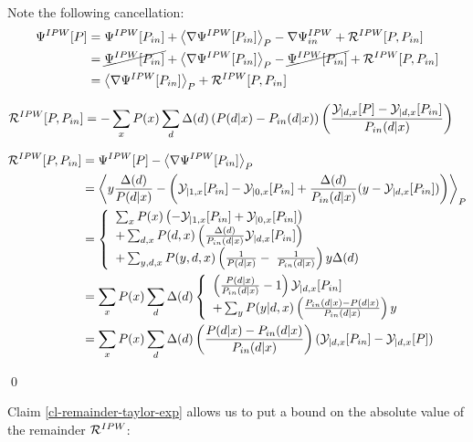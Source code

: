 Note the following cancellation:
\begin{align}
\Psi^{IPW}[P] &=
\Psi^{IPW}[P_{in}]
 + \left\langle\nabla\Psi^{IPW}[P_{in}]\right\rangle_P -\nabla\Psi^{IPW}_{in}
 + {\cal R}^{IPW}[P,P_{in}]
\\
&=
\cancel{\Psi^{IPW}[P_{in}] }
 + \left\langle\nabla\Psi^{IPW}[P_{in}]\right\rangle_P -\cancel{\Psi^{IPW}[P_{in}] }
 + {\cal R}^{IPW}[P,P_{in}]
 \\
&=
 \left\langle\nabla\Psi^{IPW}[P_{in}]\right\rangle_P
 + {\cal R}^{IPW}[P,P_{in}]
\end{align}

\begin{claim}
\label{cl-remainder-taylor-exp}
\begin{align}
{\cal R}^{IPW}[P,P_{in}]&=-
\sum_x P(x)\sum_d \Delta(d)
\left(
P(d|x)-P_{in}(d|x)
\right)
\left(
\frac{
{\cal Y}_{|d,x}[P]-{\cal Y}_{|d,x}[P_{in}]}
{P_{in}(d|x)}
\right)
\end{align}
\end{claim}
\proof

\begin{align}
{\cal R}^{IPW}[P,P_{in}]
&=
\Psi^{IPW}[P]
-\left\langle\nabla\Psi^{IPW}[P_{in}]\right\rangle_P
\\
&=
\left\langle
y \frac{\Delta(d)}{P(d|x)}
-
\left(
{\cal Y}_{|1,x}[P_{in}]
-
{\cal Y}_{|0,x}[P_{in}]
+
\frac{\Delta(d)}{P_{in}(d|x)}
(y-{\cal Y}_{|d,x}[P_{in}])
\right)
\right\rangle_{P}
\\
&=
\left\{
\begin{array}{l}
\sum_x P(x)\left(
-{\cal Y}_{|1,x}[P_{in}]
+
{\cal Y}_{|0,x}[P_{in}]
\right)
\\
+\sum_{d,x} P(d,x) \left(
\frac{\Delta(d)}{P_{in}(d|x)}
{\cal Y}_{|d,x}[P_{in}]
\right)
\\
+\sum_{y,d,x} P(y, d,x)\left(
\frac{1}{P(d|x)}-\;\frac{1}{P_{in}(d|x)}
\right) y\Delta(d)
\end{array}
\right.
\\
&=\sum_x P(x)\sum_d \Delta(d)
\left\{
\begin{array}{l}
\left(
\frac{P(d|x)}{P_{in}(d|x)}-1
\right)
{\cal Y}_{|d,x}[P_{in}]
\\
+\sum_{y}P(y|d,x)\left(
\frac{P_{in}(d|x)-P(d|x)}{P_{in}(d|x)}
\right) y
\end{array}
\right.
\\
&=
\sum_x P(x)\sum_d \Delta(d)
\left(\frac{P(d|x)-P_{in}(d|x)}{P_{in}(d|x)}
\right)
({\cal Y}_{|d,x}[P_{in}]-
{\cal Y}_{|d,x}[P])
\end{align}

\qed

Claim \ref{cl-remainder-taylor-exp}
allows us to put a bound
on the absolute value of the remainder ${\cal R}^{IPW}$:

